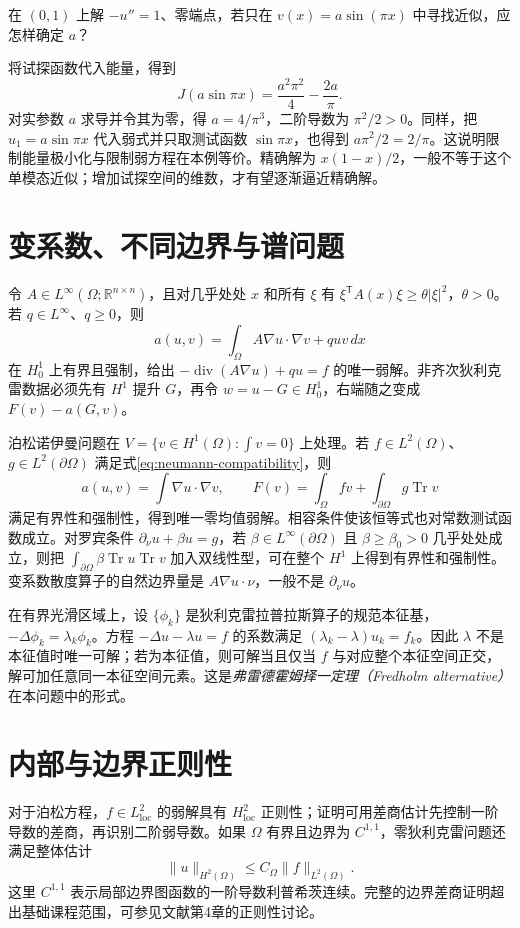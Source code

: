 \begin{example}[只用一个试探函数作变分近似]
在 $(0,1)$ 上解 $-u''=1$、零端点，若只在 $v(x)=a\sin(\pi x)$ 中寻找近似，应怎样确定 $a$？
\end{example}
\begin{solve}
将试探函数代入能量，得到
\[
 J(a\sin\pi x)=\frac{a^2\pi^2}{4}-\frac{2a}{\pi}.
\]
对实参数 $a$ 求导并令其为零，得 $a=4/\pi^3$，二阶导数为 $\pi^2/2>0$。同样，把 $u_1=a\sin\pi x$ 代入弱式并只取测试函数 $\sin\pi x$，也得到 $a\pi^2/2=2/\pi$。这说明限制能量极小化与限制弱方程在本例等价。精确解为 $x(1-x)/2$，一般不等于这个单模态近似；增加试探空间的维数，才有望逐渐逼近精确解。
\end{solve}

\section{变系数、不同边界与谱问题}
令 $A\in L^\infty(\Omega;\mathbb R^{n\times n})$，且对几乎处处 $x$ 和所有 $\xi$ 有 $\xi^{\mathsf T}A(x)\xi\ge\theta|\xi|^2$，$\theta>0$。若 $q\in L^\infty$、$q\ge0$，则
\[
 a(u,v)=\int_\Omega A\nabla u\cdot\nabla v+quv\,dx
\]
在 $H_0^1$ 上有界且强制，给出 $-\operatorname{div}(A\nabla u)+qu=f$ 的唯一弱解。非齐次狄利克雷数据必须先有 $H^1$ 提升 $G$，再令 $w=u-G\in H_0^1$，右端随之变成 $F(v)-a(G,v)$。

泊松诺伊曼问题在 $V=\{v\in H^1(\Omega):\int v=0\}$ 上处理。若 $f\in L^2(\Omega)$、$g\in L^2(\partial\Omega)$ 满足式\eqref{eq:neumann-compatibility}，则
\[
 a(u,v)=\int\nabla u\cdot\nabla v,\qquad
 F(v)=\int_\Omega fv+\int_{\partial\Omega}g\operatorname{Tr}v
\]
满足有界性和强制性，得到唯一零均值弱解。相容条件使该恒等式也对常数测试函数成立。对罗宾条件 $\partial_\nu u+\beta u=g$，若 $\beta\in L^\infty(\partial\Omega)$ 且 $\beta\ge\beta_0>0$ 几乎处处成立，则把 $\int_{\partial\Omega}\beta\operatorname{Tr}u\operatorname{Tr}v$ 加入双线性型，可在整个 $H^1$ 上得到有界性和强制性。变系数散度算子的自然边界量是 $A\nabla u\cdot\nu$，一般不是 $\partial_\nu u$。

在有界光滑区域上，设 $\{\phi_k\}$ 是狄利克雷拉普拉斯算子的规范本征基，$-\Delta\phi_k=\lambda_k\phi_k$。方程 $-\Delta u-\lambda u=f$ 的系数满足 $(\lambda_k-\lambda)u_k=f_k$。因此 $\lambda$ 不是本征值时唯一可解；若为本征值，则可解当且仅当 $f$ 与对应整个本征空间正交，解可加任意同一本征空间元素。这是\emph{弗雷德霍姆择一定理（Fredholm alternative）}在本问题中的形式。

\section{内部与边界正则性}
对于泊松方程，$f\in L^2_{\mathrm{loc}}$ 的弱解具有 $H^2_{\mathrm{loc}}$ 正则性；证明可用差商估计先控制一阶导数的差商，再识别二阶弱导数。如果 $\Omega$ 有界且边界为 $C^{1,1}$，零狄利克雷问题还满足整体估计
\[
 \|u\|_{H^2(\Omega)}\le C_\Omega\|f\|_{L^2(\Omega)}.
\]
这里 $C^{1,1}$ 表示局部边界图函数的一阶导数利普希茨连续。完整的边界差商证明超出基础课程范围，可参见文献\cite{hunter}第4章的正则性讨论。

